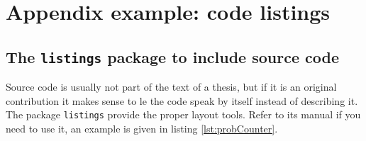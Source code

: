 \chapter{Appendix example: code listings}


\section{The \texttt{listings} package to include source code}
Source code is usually not part of the text of a thesis, but if it is an original contribution it makes sense to le the code speak by itself instead of describing it. The package \verb!listings! provide the proper layout tools. Refer to its manual if you need to use it, an example is given in listing \ref{lst:probCounter}.

